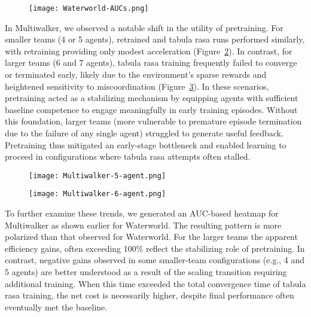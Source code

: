\documentclass{article}
\begin{document}
\begin{figure}[h]
    \centering
    \texttt{[image: Waterworld-AUCs.png]}
    \caption{}
    \label{fig:waterworld-aucs}
\end{figure}

In Multiwalker, we observed a notable shift in the utility of pretraining. 
For smaller teams (4 or 5 agents), retrained and tabula rasa runs performed similarly, 
with retraining providing only modest acceleration (Figure~\ref{fig:multiwalker-5}). 
In contrast, for larger teams (6 and 7 agents), tabula rasa training frequently failed to 
converge or terminated early, likely due to the environment's sparse rewards and heightened 
sensitivity to miscoordination (Figure~\ref{fig:multiwalker-6}). 
In these scenarios, pretraining acted as a stabilizing mechanism by equipping agents 
with sufficient baseline competence to engage meaningfully in early training episodes. 
Without this foundation, larger teams (more vulnerable to premature episode termination 
due to the failure of any single agent) struggled to generate useful feedback. 
Pretraining thus mitigated an early-stage bottleneck and enabled learning to proceed 
in configurations where tabula rasa attempts often stalled.

\begin{figure}[!h]
    \centering
    \texttt{[image: Multiwalker-5-agent.png]}
    \caption{}
    \label{fig:multiwalker-5}
\end{figure}

\vspace{2em}

\begin{figure}[!h]
    \centering
    \texttt{[image: Multiwalker-6-agent.png]}
    \caption{}
    \label{fig:multiwalker-6}
\end{figure}

To further examine these trends, we generated an AUC-based heatmap for Multiwalker as shown 
earlier for Waterworld. The resulting pattern is more polarized than that observed for Waterworld.
For the larger teams the apparent efficiency gains, often exceeding 100\%
reflect the stabilizing role of pretraining.
In contrast, negative gains observed in some smaller-team configurations (e.g., 4 and 5 agents) 
are better understood as a result of the scaling transition requiring additional training. 
When this time exceeded the total convergence time of tabula rasa training, 
the net cost is necessarily higher, despite final performance often eventually met the baseline.
\end{document}
